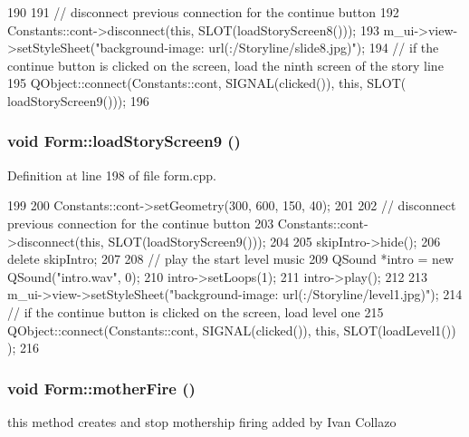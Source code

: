 \begin{DoxyCode}
190 {
191     // disconnect previous connection for the continue button
192     Constants::cont->disconnect(this, SLOT(loadStoryScreen8()));
193     m_ui->view->setStyleSheet("background-image: url(:/Storyline/slide8.jpg)");
194     // if the continue button is clicked on the screen, load the ninth screen of 
      the story line
195     QObject::connect(Constants::cont, SIGNAL(clicked()), this, SLOT(
      loadStoryScreen9()));
196 }
\end{DoxyCode}
\hypertarget{class_form_ad606b52ace6c58a2985f52b56ee099fb}{
\subsubsection[{loadStoryScreen9}]{\setlength{\rightskip}{0pt plus 5cm}void Form::loadStoryScreen9 ()}}
\label{class_form_ad606b52ace6c58a2985f52b56ee099fb}


Definition at line 198 of file form.cpp.


\begin{DoxyCode}
199 {
200     Constants::cont->setGeometry(300, 600, 150, 40);
201 
202     // disconnect previous connection for the continue button
203     Constants::cont->disconnect(this, SLOT(loadStoryScreen9()));
204 
205     skipIntro->hide();
206     delete skipIntro;
207     
208     // play the start level music
209     QSound *intro = new QSound("intro.wav", 0);
210     intro->setLoops(1);
211     intro->play();
212 
213     m_ui->view->setStyleSheet("background-image: url(:/Storyline/level1.jpg)");
214     // if the continue button is clicked on the screen, load level one
215     QObject::connect(Constants::cont, SIGNAL(clicked()), this, SLOT(loadLevel1())
      );
216 }
\end{DoxyCode}
\hypertarget{class_form_a9b89dc517d820fdcf314068b40431c77}{
\subsubsection[{motherFire}]{\setlength{\rightskip}{0pt plus 5cm}void Form::motherFire ()}}
\label{class_form_a9b89dc517d820fdcf314068b40431c77}
this method creates and stop mothership firing added by Ivan Collazo 

